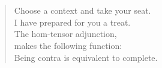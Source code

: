 

\section*{}

\vspace*{6cm}
\begin{verse}
    \hspace{3em}Choose a context and take your seat. \\
    \vspace{5pt}
    \hspace{3em}I have prepared for you a treat. \\
    \vspace{5pt}
    \hspace{3em}The hom-tensor adjunction, \\
    \vspace{5pt}
    \hspace{3em}makes the following function: \\
    \vspace{5pt}
    \hspace{3em}Being contra is equivalent to complete. 

\end{verse}